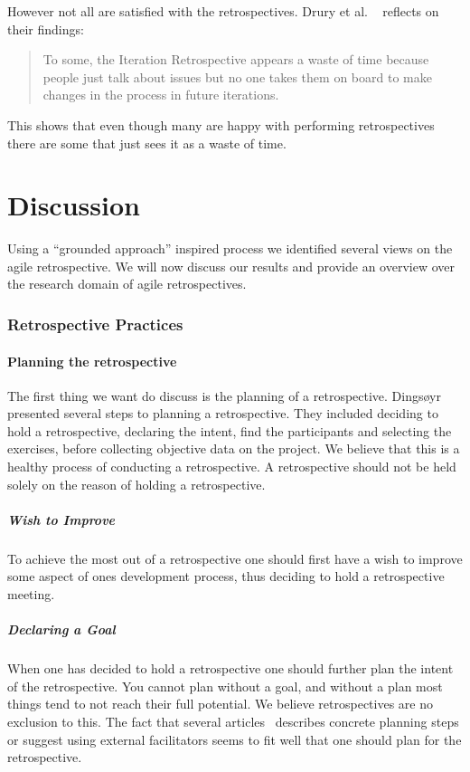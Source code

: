 \documentclass[12pt]{article}
\begin{document}
However not all are satisfied with the retrospectives. Drury et al. ~\cite{Drury2012} reflects on their findings: 
\begin{quote}
To some, the Iteration Retrospective appears a waste of time because people just talk about issues but no one takes them on board to make changes in the process in future iterations.
\end{quote}
This shows that even though many are happy with performing retrospectives there are some that just sees it as a waste of time. 

\clearpage

\part{Discussion}
Using a ``grounded approach'' inspired process we identified several views on the agile retrospective. We will now discuss our results and provide an overview over the research domain of agile retrospectives.

\section{Retrospective Practices}
\subsection{Planning the retrospective}
The first thing we want do discuss is the planning of a retrospective. Dingsøyr~\cite{Dingsoyr2005} presented several steps to planning a retrospective. They included deciding to hold a retrospective, declaring the intent, find the participants and selecting the exercises, before collecting objective data on the project. We believe that this is a healthy process of conducting a retrospective. A retrospective should not be held solely on the reason of holding a retrospective. 

\subsubsection{Wish to Improve} 
To achieve the most out of a retrospective one should first have a wish to improve some aspect of ones development process, thus deciding to hold a retrospective meeting. 

\subsubsection{Declaring a Goal}
When one has decided to hold a retrospective one should further plan the intent of the retrospective. You cannot plan without a goal, and without a plan most things tend to not reach their full potential. We believe retrospectives are no exclusion to this. The fact that several articles~\cite{Dingsoyr2005, Bjornson2009, Hanssen2003, Maham2008, Birk2002, Moe2001} describes concrete planning steps or suggest using external facilitators seems to fit well that one should plan for the retrospective. 
\end{document}
